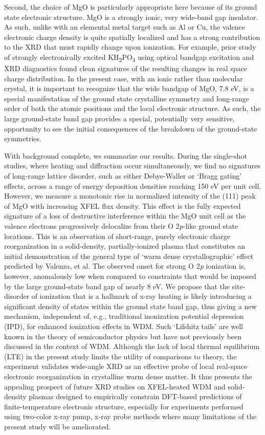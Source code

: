 Second, the choice of MgO is particularly appropriate here because of
its ground state electronic structure. MgO is a strongly ionic, very
wide-band gap insulator. As such, unlike with an elemental metal target
such as Al or Cu, the valence electronic charge density is quite
spatially localized and has a strong contribution to the XRD that must
rapidly change upon ionization. For example, prior study of strongly
electronically excited KH\textsubscript{2}PO\textsubscript{4} using
optical bandgap excitation and XRD diagnostics found clean signatures of
the resulting changes in real space charge distribution. In the present
case, with an ionic rather than molecular crystal, it is important to
recognize that the wide bandgap of MgO, 7.8 eV, is a special
manifestation of the ground state crystalline symmetry and long-range
order of both the atomic positions and the local electronic structure.
As such, the large ground-state band gap provides a special, potentially
very sensitive, opportunity to see the initial consequences of the
breakdown of the ground-state symmetries.

With background complete, we summarize our results. During the
single-shot studies, where heating and diffraction occur simultaneously,
we find no signatures of long-range lattice disorder, such as either
Debye-Waller or `Bragg gating' effects, across a range of energy
deposition densities reaching 150 eV per unit cell. However, we measure
a monotonic rise in normalized intensity of the (111) peak of MgO with
increasing XFEL flux density. This effect is the fully expected
signature of a loss of destructive interference within the MgO unit cell
as the valence electrons progressively delocalize from their O
2\emph{p}-like ground state locations. This is an observation of
short-range, purely electronic charge reorganization in a solid-density,
partially-ionized plasma that constitutes an initial demonstration of
the general type of `warm dense crystallographic' effect predicted by
Valenza, et al. \cite{valenza2016warm} The observed onset for strong O 2\emph{p}
ionization is, however, anomalously low when compared to constraints
that would be imposed by the large ground-state band gap of nearly 8 eV.
We propose that the site-disorder of ionization that is a hallmark of
x-ray heating is likely introducing a significant density of states
within the ground state band gap, thus giving a new mechanism,
independent of, e.g., traditional inonization potential depression
(IPD), for enhanced ionization effects in WDM. Such `Lifshitz tails' are
well known in the theory of semiconductor physics but have not
previously been discussed in the context of WDM. Although the lack of
local thermal equilibrium (LTE) in the present study limits the utility
of comparisons to theory, the experiment validates wide-angle XRD as an
effective probe of local real-space electronic reorganization in
crystalline warm dense matter. It thus presents the appealing prospect
of future XRD studies on XFEL-heated WDM and solid-density plasmas
designed to empirically constrain DFT-based predictions of
finite-temperature electronic structure, especially for experiments
performed using two-color x-ray pump, x-ray probe methods where many
limitations of the present study will be ameliorated.

